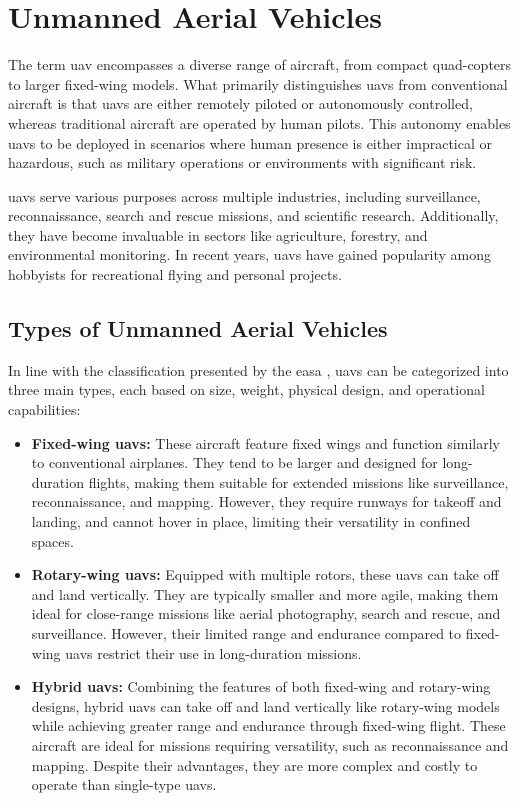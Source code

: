 \chapter{Unmanned Aerial Vehicles}\label{ch:unmanned_aerial_vehicles}

The term \gls{uav} encompasses a diverse range of aircraft, from compact quad-copters to larger fixed-wing models. What primarily distinguishes \glspl{uav} from conventional aircraft is that \glspl{uav} are either remotely piloted or autonomously controlled, whereas traditional aircraft are operated by human pilots. This autonomy enables \glspl{uav} to be deployed in scenarios where human presence is either impractical or hazardous, such as military operations or environments with significant risk.

\glspl{uav} serve various purposes across multiple industries, including surveillance, reconnaissance, search and rescue missions, and scientific research. Additionally, they have become invaluable in sectors like agriculture, forestry, and environmental monitoring. In recent years, \glspl{uav} have gained popularity among hobbyists for recreational flying and personal projects.

\section{Types of Unmanned Aerial Vehicles}\label{sec:uav_types}

In line with the classification presented by the \gls{easa} \autocite{eu-947-2019}, \glspl{uav} can be categorized into three main types, each based on size, weight, physical design, and operational capabilities:

\begin{itemize}
  \item \textbf{Fixed-wing \glspl{uav}:} These aircraft feature fixed wings and function similarly to conventional airplanes. They tend to be larger and designed for long-duration flights, making them suitable for extended missions like surveillance, reconnaissance, and mapping. However, they require runways for takeoff and landing, and cannot hover in place, limiting their versatility in confined spaces.

  \item \textbf{Rotary-wing \glspl{uav}:} Equipped with multiple rotors, these \glspl{uav} can take off and land vertically. They are typically smaller and more agile, making them ideal for close-range missions like aerial photography, search and rescue, and surveillance. However, their limited range and endurance compared to fixed-wing \glspl{uav} restrict their use in long-duration missions.

  \item \textbf{Hybrid \glspl{uav}:} Combining the features of both fixed-wing and rotary-wing designs, hybrid \glspl{uav} can take off and land vertically like rotary-wing models while achieving greater range and endurance through fixed-wing flight. These aircraft are ideal for missions requiring versatility, such as reconnaissance and mapping. Despite their advantages, they are more complex and costly to operate than single-type \glspl{uav}.
\end{itemize}

